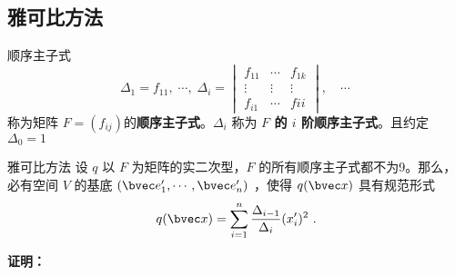 \subsection{雅可比方法}
\begin{definition}{顺序主子式}
\begin{equation}
\Delta_1=f_{11},\;\cdots,\;\Delta_i=\begin{vmatrix}
f_{11}&\cdots&f_{1k}\\
\vdots&\vdots&\vdots\\
f_{i1}&\cdots&f{ii}
\end{vmatrix},\quad
\cdots~
\end{equation}
称为矩阵 $F=(f_{ij})$的\textbf{顺序主子式}。$\Delta_i$ 称为\textbf{ $F$ 的 $i$ 阶顺序主子式}。且约定 $\Delta_0=1$
\end{definition}
\begin{theorem}{雅可比方法}
设 $q$ 以 $F$ 为矩阵的实二次型，$F$ 的所有顺序主子式都不为9。那么，必有空间 $V$ 的基底 $(\bvec e'_1,\cdots,\bvec e'_n)$ ，使得 $q(\bvec x)$ 具有规范形式
\begin{equation}\label{eq_DeQua_4}
q(\bvec x)=\sum_{i=1}^n\frac{\Delta_{i-1}}{\Delta_i}(x'_i)^2~.
\end{equation}
\end{theorem}
\textbf{证明：}
